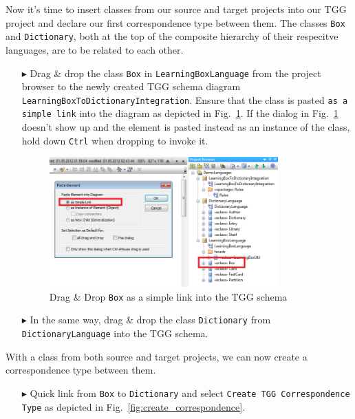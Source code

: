 Now it's time to insert classes from our source and target projects into our TGG project and declare our first correspondence type between them.
The classes \texttt{Box} and \texttt{Dictionary}, both at the top of the composite hierarchy of their respecitve languages, are to be related to each other.
\begin{enumerate}
\item[$\blacktriangleright$] Drag \& drop the class \texttt{Box} in \texttt{Learning\-Box\-Language} from the project 
browser to the newly created TGG schema diagram \texttt{Learning\-Box\-To\-Dictionary\-Integration}.
Ensure that the class is pasted \texttt{as a simple link} into the diagram as depicted in Fig.~\ref{fig:drag_drop_box}. 
If the dialog in Fig.~\ref{fig:drag_drop_box} doesn't show up and the element is pasted instead as an instance of the class, hold down \texttt{Ctrl} when dropping to invoke it.

\begin{figure}[htbp]
\begin{center}
  \includegraphics[width=0.83\textwidth]{pics/tggBilder/tggSchema/tgg4}
  \caption{Drag \& Drop \texttt{Box} as a simple link into the TGG schema} 
  \label{fig:drag_drop_box}
\end{center}
\end{figure}

\item[$\blacktriangleright$] In the same way, drag \& drop the class \texttt{Dictionary} from \texttt{Dictionary\-Language} into the TGG schema. 
\end{enumerate}

With a class from both source and target projects, we can now create a correspondence type between them.
\begin{enumerate}
\item[$\blacktriangleright$] Quick link from \texttt{Box} to \texttt{Dictionary} and select \texttt{Create TGG Corres\-pon\-dence Type} as depicted in Fig.~\ref{fig:create_correspondence}.
\end{enumerate}


